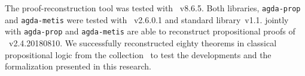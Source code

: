 \documentclass[../paper.tex]{subfiles}
\begin{document}
The proof-reconstruction tool \Athena was tested with
~v8.6.5. Both libraries, \verb!agda-prop! and
\verb!agda-metis! were tested with \Agda~v2.6.0.1 and \Agda standard
library~v1.1. \Athena jointly with \verb!agda-prop! and
\verb!agda-metis! are able to reconstruct propositional proofs of
\Metis~v2.4.20180810. We successfully reconstructed eighty theorems in
classical propositional logic from the \TPTP
collection~\cite{Prieto-Cubides2017} to test the developments and the
formalization presented in this research.
\end{document}
